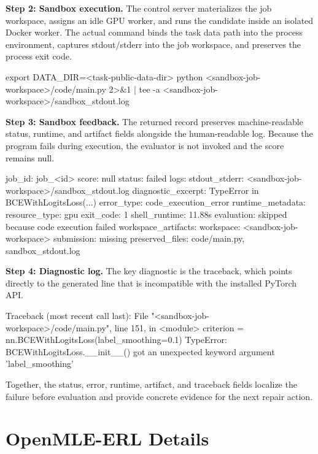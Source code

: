 \noindent\textbf{Step 2: Sandbox execution.}
The control server materializes the job workspace, assigns an idle GPU worker, and runs the candidate inside an isolated Docker worker.
The actual command binds the task data path into the process environment, captures stdout/stderr into the job workspace, and preserves the process exit code.

\begin{SandboxTranscript}
export DATA_DIR=<task-public-data-dir>
python <sandbox-job-workspace>/code/main.py
2>&1 | tee -a <sandbox-job-workspace>/sandbox_stdout.log
\end{SandboxTranscript}

\noindent\textbf{Step 3: Sandbox feedback.}
The returned record preserves machine-readable status, runtime, and artifact fields alongside the human-readable log. Because the program fails during execution, the evaluator is not invoked and the score remains null.

\begin{SandboxTranscript}
job_id: job_<id>
score: null
status: failed
logs:
  stdout_stderr: <sandbox-job-workspace>/sandbox_stdout.log
  diagnostic_excerpt: TypeError in BCEWithLogitsLoss(...)
error_type: code_execution_error
runtime_metadata:
  resource_type: gpu
  exit_code: 1
  shell_runtime: 11.88s
  evaluation: skipped because code execution failed
workspace_artifacts:
  workspace: <sandbox-job-workspace>
  submission: missing
  preserved_files: code/main.py, sandbox_stdout.log
\end{SandboxTranscript}

\noindent\textbf{Step 4: Diagnostic log.}
The key diagnostic is the traceback, which points directly to the generated line that is incompatible with the installed PyTorch API.

\begin{SandboxTranscript}
Traceback (most recent call last):
  File "<sandbox-job-workspace>/code/main.py", line 151, in <module>
    criterion = nn.BCEWithLogitsLoss(label_smoothing=0.1)
TypeError: BCEWithLogitsLoss.__init__() got an unexpected keyword argument
  'label_smoothing'
\end{SandboxTranscript}

Together, the status, error, runtime, artifact, and traceback fields localize the failure before evaluation and provide concrete evidence for the next repair action.

\section{OpenMLE-ERL Details}
\label{app:training-configs}

